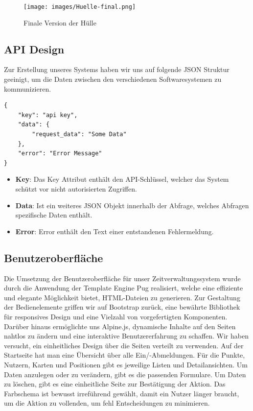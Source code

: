 \documentclass[../main.tex]{subfiles}
\begin{document}
\begin{figure}[!h]
    \centering
    \texttt{[image: images/Huelle-final.png]}
    \caption{Finale Version der Hülle}
    \centering
\end{figure}

\subsection{API Design} \label{JSON-API}

Zur Erstellung unseres Systems haben wir uns auf folgende JSON Struktur geeinigt, um die Daten zwischen den verschiedenen Softwaresystemen zu kommunizieren. 

\begin{lstlisting}
{
    "key": "api key",
    "data": {
        "request_data": "Some Data"
    },
    "error": "Error Message"
}
\end{lstlisting}

\begin{itemize}
  \item\textbf{Key}: Das Key Attribut enthält den API-Schlüssel, welcher das System schützt vor nicht autorisierten Zugriffen.
  \item\textbf{Data}: Ist ein weiteres JSON Objekt innerhalb der Abfrage, welches Abfragen spezifische Daten enthält.
  \item\textbf{Error}: Error enthält den Text einer entstandenen Fehlermeldung.
\end{itemize}

\subsection{Benutzeroberfläche}

Die Umsetzung der Benutzeroberfläche für unser Zeitverwaltungssystem wurde durch die Anwendung der Template Engine Pug realisiert, welche eine effiziente und elegante Möglichkeit bietet, HTML-Dateien zu generieren. Zur Gestaltung der Bedienelemente griffen wir auf Bootstrap zurück, eine bewährte Bibliothek für responsives Design und eine Vielzahl von vorgefertigten Komponenten. Darüber hinaus ermöglichte uns Alpine.js, dynamische Inhalte auf den Seiten nahtlos zu ändern und eine interaktive Benutzererfahrung zu schaffen. 
Wir haben versucht, ein einheitliches Design über die Seiten verteilt zu verwenden. Auf der Startseite hat man eine Übersicht über alle Ein/-Abmeldungen. Für die Punkte, Nutzern, Karten und Positionen gibt es jeweilige Listen und Detailansichten. Um Daten anzulegen oder zu verändern, gibt es die passenden Formulare. Um Daten zu löschen, gibt es eine einheitliche Seite zur Bestätigung der Aktion. Das Farbschema ist bewusst irreführend gewählt, damit ein Nutzer länger braucht, um die Aktion zu vollenden, um fehl Entscheidungen zu minimieren.
\end{document}
